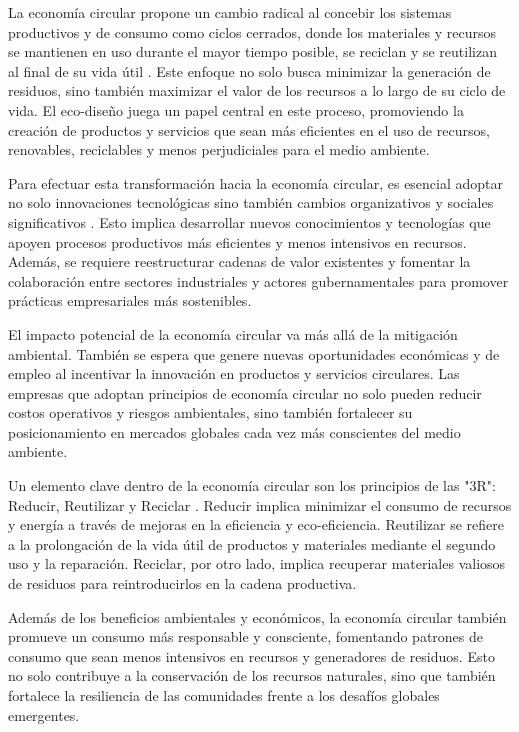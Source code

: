 \documentclass[main.tex]{subfiles}
\begin{document}
La economía circular propone un cambio radical al concebir los sistemas productivos y de consumo como ciclos cerrados, donde los materiales y recursos se mantienen en uso durante el mayor tiempo posible, se reciclan y se reutilizan al final de su vida útil \cite{circular2017economia}. Este enfoque no solo busca minimizar la generación de residuos, sino también maximizar el valor de los recursos a lo largo de su ciclo de vida. El eco-diseño juega un papel central en este proceso, promoviendo la creación de productos y servicios que sean más eficientes en el uso de recursos, renovables, reciclables y menos perjudiciales para el medio ambiente.

Para efectuar esta transformación hacia la economía circular, es esencial adoptar no solo innovaciones tecnológicas sino también cambios organizativos y sociales significativos \cite{espanacircular2030}. Esto implica desarrollar nuevos conocimientos y tecnologías que apoyen procesos productivos más eficientes y menos intensivos en recursos. Además, se requiere reestructurar cadenas de valor existentes y fomentar la colaboración entre sectores industriales y actores gubernamentales para promover prácticas empresariales más sostenibles.

El impacto potencial de la economía circular va más allá de la mitigación ambiental. También se espera que genere nuevas oportunidades económicas y de empleo al incentivar la innovación en productos y servicios circulares. Las empresas que adoptan principios de economía circular no solo pueden reducir costos operativos y riesgos ambientales, sino también fortalecer su posicionamiento en mercados globales cada vez más conscientes del medio ambiente.

Un elemento clave dentro de la economía circular son los principios de las "3R": Reducir, Reutilizar y Reciclar \cite{cerda2016economia}. Reducir implica minimizar el consumo de recursos y energía a través de mejoras en la eficiencia y eco-eficiencia. Reutilizar se refiere a la prolongación de la vida útil de productos y materiales mediante el segundo uso y la reparación. Reciclar, por otro lado, implica recuperar materiales valiosos de residuos para reintroducirlos en la cadena productiva.

Además de los beneficios ambientales y económicos, la economía circular también promueve un consumo más responsable y consciente, fomentando patrones de consumo que sean menos intensivos en recursos y generadores de residuos. Esto no solo contribuye a la conservación de los recursos naturales, sino que también fortalece la resiliencia de las comunidades frente a los desafíos globales emergentes.
\end{document}
